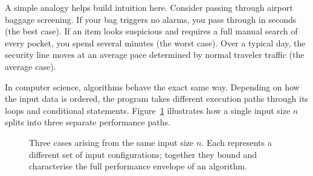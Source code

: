 \documentclass[11pt,a4paper]{article}
\begin{document}
A simple analogy helps build intuition here. Consider passing through airport baggage
screening. If your bag triggers no alarms, you pass through in seconds (the best case).
If an item looks suspicious and requires a full manual search of every pocket, you spend
several minutes (the worst case). Over a typical day, the security line moves at an
average pace determined by normal traveler traffic (the average case).

In computer science, algorithms behave the exact same way. Depending on how the input
data is ordered, the program takes different execution paths through its loops and
conditional statements. Figure~\ref{fig:intuition} illustrates how a single input
size $n$ splits into three separate performance paths.

\begin{figure}[h]
\centering
{}
\caption{Three cases arising from the same input size $n$. Each represents a
different set of input configurations; together they bound and characterise the
full performance envelope of an algorithm.}
\label{fig:intuition}
\end{figure}
\end{document}
